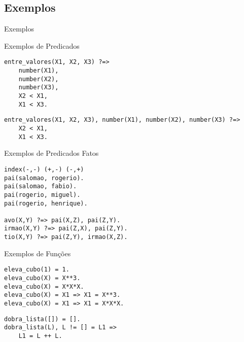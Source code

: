 \subsection{Exemplos}
\begin{frame}{Exemplos}

    \begin{block}{Exemplos de Predicados}
    
        \begin{lstlisting}[frame=single]
entre_valores(X1, X2, X3) ?=>
    number(X1),
    number(X2),
    number(X3),
    X2 < X1,
    X1 < X3.
        \end{lstlisting}
        
        \begin{lstlisting}[frame=single]
entre_valores(X1, X2, X3), number(X1), number(X2), number(X3) ?=>
    X2 < X1,
    X1 < X3.
        \end{lstlisting}
        
    \end{block}
    
    \framebreak
    
    \begin{block}{Exemplos de Predicados Fatos}
    
        \begin{lstlisting}[frame=single]
index(-,-) (+,-) (-,+)
pai(salomao, rogerio).
pai(salomao, fabio).
pai(rogerio, miguel).
pai(rogerio, henrique).

avo(X,Y) ?=> pai(X,Z), pai(Z,Y).
irmao(X,Y) ?=> pai(Z,X), pai(Z,Y).
tio(X,Y) ?=> pai(Z,Y), irmao(X,Z).
        \end{lstlisting}
    
    \end{block}
    
    \framebreak
    
    \begin{block}{Exemplos de Funções}
    
        \begin{lstlisting}[frame=single]
eleva_cubo(1) = 1.
eleva_cubo(X) = X**3.
eleva_cubo(X) = X*X*X.
eleva_cubo(X) = X1 => X1 = X**3.
eleva_cubo(X) = X1 => X1 = X*X*X.
        \end{lstlisting}
        
        \begin{lstlisting}[frame=single]
dobra_lista([]) = [].
dobra_lista(L), L != [] = L1 =>
    L1 = L ++ L.
        \end{lstlisting}
    
    \end{block}
    
\end{frame}

